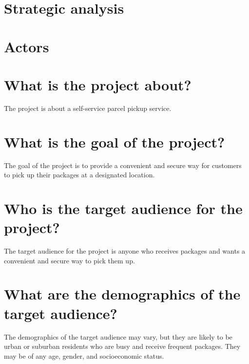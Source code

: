 \documentclass{article}
\begin{document}
\section{Strategic analysis}

\lipsum[1]

\section{Actors}

\lipsum[2]

\section{What is the project about?}
The project is about a self-service parcel pickup service.

\section{What is the goal of the project?}
The goal of the project is to provide a convenient and secure way for customers to pick up their packages at a designated location.

\section{Who is the target audience for the project?}
The target audience for the project is anyone who receives packages and wants a convenient and secure way to pick them up.

\section{What are the demographics of the target audience?}
The demographics of the target audience may vary, but they are likely to be urban or suburban residents who are busy and receive frequent packages. They may be of any age, gender, and socioeconomic status.
\end{document}
